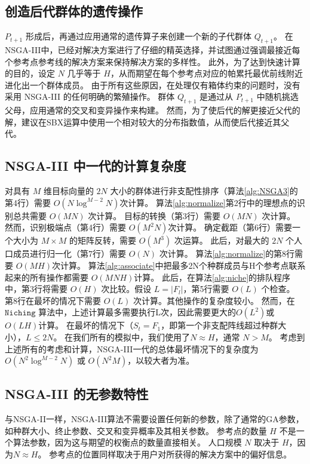 \subsection{创造后代群体的遗传操作}
$P_{t+1}$ 形成后，再通过应用通常的遗传算子来创建一个新的子代群体 $Q_{t+1}$。%
在NSGA-III中，已经对解决方案进行了仔细的精英选择，并试图通过强调最接近每个参考点参考线的解决方案来保持解决方案的多样性。%
此外，为了达到快速计算的目的，设定 $N$ 几乎等于 $H$，从而期望在每个参考点对应的帕累托最优前线附近进化出一个群体成员。%
由于所有这些原因，在处理仅有箱体约束的问题时，没有采用 NSGA-III 的任何明确的繁殖操作。%
群体 $Q_{t+1}$ 是通过从 $P_{t+1}$ 中随机挑选父母，应用通常的交叉和变异操作来构建。%
然而，为了使后代的解更接近父代的解，建议在SBX运算中使用一个相对较大的分布指数值，从而使后代接近其父代。

\subsection{NSGA-III 中一代的计算复杂度}
对具有 $M$ 维目标向量的 $2N$ 大小的群体进行非支配性排序（算法\ref{alg:NSGA3}的第4行）需要 $O(N \log ^{M-2} N)$次计算\cite{kung1975}。%
算法\ref{alg:normalize}第2行中的理想点的识别总共需要 $O(MN)$ 次计算。%
目标的转换（第3行）需要 $O(MN)$ 次计算。%
然而，识别极端点（第4行）需要 $O(M^2N)$次计算。%
确定截距（第6行）需要一个大小为 $M \times M$ 的矩阵反转，需要 $O(M^3)$ 次运算。%
此后，对最大的 $2N$ 个人口成员进行归一化（第7行）需要 $O(N)$ 次计算。%
算法\ref{alg:normalize}的第8行需要 $O(MH)$次计算。%
算法\ref{alg:associate}中把最多2N个种群成员与H个参考点联系起来的所有操作都需要 $O(MNH)$计算。%
此后，在算法\ref{alg:niche}的排队程序中，第3行将需要 $O(H)$ 次比较。假设 $L=|F_l|$，第5行需要 $O(L)$ 个检查。%
第8行在最坏的情况下需要 $O(L)$ 次计算。其他操作的复杂度较小。%
然而，在 $\mathtt{Niching}$ 算法中，上述计算最多需要执行L次，因此需要更大的$O(L^2)$或$O(LH)$计算。%
在最坏的情况下（$S_t = F_1$，即第一个非支配阵线超过种群大小），$L \le 2N$。%
在我们所有的模拟中，我们使用了$N \approx H$，通常 $N > M$。%
考虑到上述所有的考虑和计算，NSGA-III一代的总体最坏情况下的复杂度为 $O(N^2 \log^{M-2} N)$ 或 $O(N^2M)$，以较大者为准。

\subsection{NSGA-III 的无参数特性}
与NSGA-II一样，NSGA-III算法不需要设置任何新的参数，除了通常的GA参数，如种群大小、终止参数、交叉和变异概率及其相关参数。%
参考点的数量 $H$ 不是一个算法参数，因为这与期望的权衡点的数量直接相关。%
人口规模 $N$ 取决于 $H$，因为$N \approx H$。%
参考点的位置同样取决于用户对所获得的解决方案中的偏好信息。
